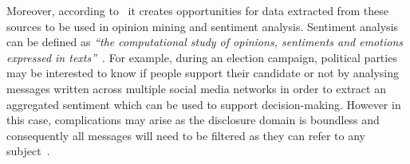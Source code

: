 Moreover, according to~\textcite{rep:LERC} it creates opportunities for data extracted from these sources to be used in opinion mining and sentiment analysis. Sentiment analysis can be defined as \emph{``the computational study of opinions, sentiments and emotions expressed in texts''}~\parencite{inbook:lang_proc_sec}.  For example, during an election campaign, political parties may be interested to know if people support their candidate or not by analysing messages written across multiple social media networks in order to extract an aggregated sentiment which can be used to support decision-making. However in this case, complications may arise as the disclosure domain is boundless and consequently all messages will need to be filtered as they can refer to any subject~\parencite{art:computers_human_behaviour}.
